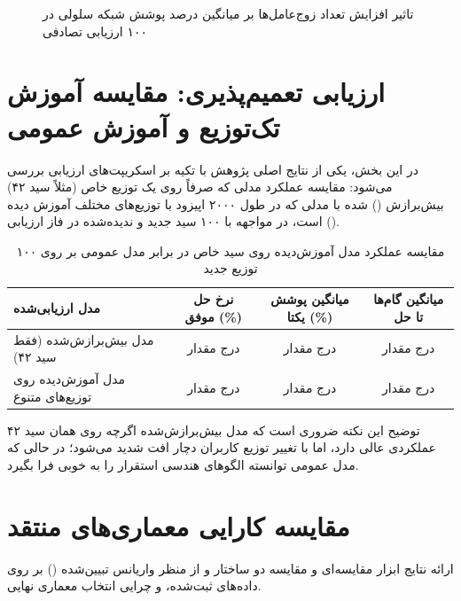 \documentclass[a4paper,12pt,oneside]{report}
\begin{document}
\begin{figure}[H]
    \centering
    \caption{تاثیر افزایش تعداد زوج‌عامل‌ها بر میانگین درصد پوشش شبکه سلولی در ۱۰۰ ارزیابی تصادفی}
    \label{fig:agent_pairs_scalability}
\end{figure}


\section{ارزیابی تعمیم‌پذیری: مقایسه آموزش تک‌توزیع و آموزش عمومی}
در این بخش، یکی از نتایج اصلی پژوهش با تکیه بر اسکریپت‌های ارزیابی بررسی می‌شود: مقایسه عملکرد مدلی که صرفاً روی یک توزیع خاص (مثلاً سید ۴۲) بیش‌برازش () شده با مدلی که در طول ۲۰۰۰ اپیزود با توزیع‌های مختلف آموزش دیده است، در مواجهه با ۱۰۰ سید جدید و ندیده‌شده در فاز ارزیابی ().

\begin{table}[H]
    \centering
    \caption{مقایسه عملکرد مدل آموزش‌دیده روی سید خاص در برابر مدل عمومی بر روی ۱۰۰ توزیع جدید}
    \label{tab:generalization_results}
    \begin{tabular}{lccc}
        \toprule
        \textbf{مدل ارزیابی‌شده} & \textbf{نرخ حل موفق (\%)} & \textbf{میانگین پوشش یکتا (\%)} & \textbf{میانگین گام‌ها تا حل} \\
        \midrule
        مدل بیش‌برازش‌شده (فقط سید ۴۲) & درج مقدار & درج مقدار & درج مقدار \\
        مدل آموزش‌دیده روی توزیع‌های متنوع & درج مقدار & درج مقدار & درج مقدار \\
        \bottomrule
    \end{tabular}
\end{table}

توضیح این نکته ضروری است که مدل بیش‌برازش‌شده اگرچه روی همان سید ۴۲ عملکردی عالی دارد، اما با تغییر توزیع کاربران دچار افت شدید می‌شود؛ در حالی که مدل عمومی توانسته الگوهای هندسی استقرار را به خوبی فرا بگیرد.

\section{مقایسه کارایی معماری‌های منتقد}
ارائه نتایج ابزار مقایسه‌ای  و مقایسه دو ساختار  و  از منظر واریانس تبیین‌شده () بر روی داده‌های ثبت‌شده، و چرایی انتخاب معماری نهایی.
\end{document}
